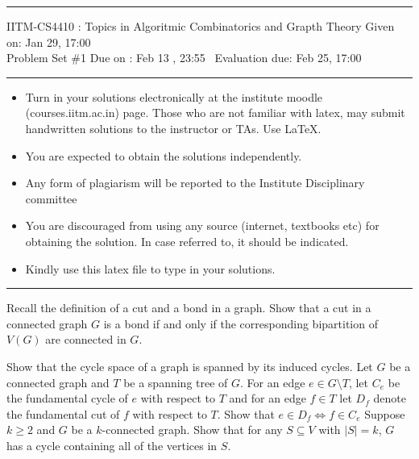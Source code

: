 \documentclass[solution,addpoints,12pt]{exam}
\begin{document}
\hrule
\vspace{3mm}
\noindent 
{\sf IITM-CS4410 : Topics in Algoritmic Combinatorics and Grapth Theory  \hfill Given on: Jan 29, 17:00}
\vspace{3mm}\\
\noindent 
{\sf Problem Set \#1 \hfill Due on : Feb 13 , 23:55 }
{\sf ~\hfill Evaluation due: Feb 25, 17:00}
\vspace{3mm}
\hrule
{\small
\begin{itemize}
\item Turn in your solutions electronically at the institute moodle (courses.iitm.ac.in) page. Those who are not familiar with latex, may submit handwritten solutions to the instructor or TAs. 
  Use LaTeX.
\item  You are expected to obtain the solutions independently.    
\item Any form of plagiarism will be reported to the Institute Disciplinary committee
\item  You are discouraged from using any source (internet, textbooks etc) for obtaining the solution. In case referred to, it should be indicated.  
\item Kindly use this latex file to type in your solutions. %
\end{itemize}}
\hrule
\vspace{3mm}
\begin{questions}


\question[6]  Recall the definition of a cut and a bond in a graph. Show that a cut in a connected graph $G$ is a bond if and only if the corresponding bipartition of $V(G)$ are connected in $G$. 

\question[6] Show that the cycle space of a graph is spanned by its induced cycles.  
\question[8] Let $G$ be a connected graph and $T$ be a spanning tree of $G$. For an edge $e\in G\setminus T$, let $C_e$ be the fundamental cycle of $e$ with respect to $T$ and for an edge $f\in T$ let $D_f$ denote the fundamental cut of $f$ with respect to $T$. Show that $e\in D_f \iff f \in C_e$  
\question[10] Suppose $k\ge 2$ and $G$ be a $k$-connected graph. Show that for any $S\subseteq V$ with $|S| = k$, $G$ has a cycle containing all of the vertices in $S$. 
 



\end{questions}
\end{document}
